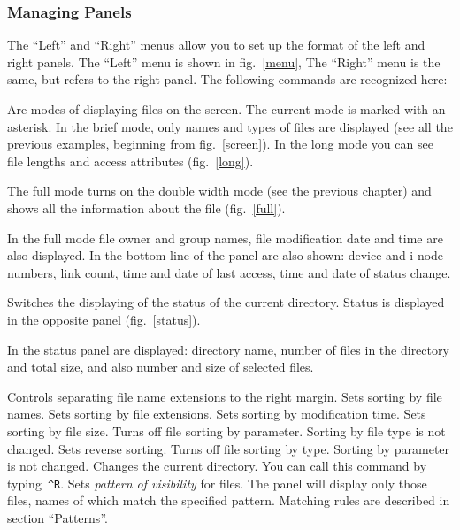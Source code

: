 \subsubsection{Managing Panels}
 
The ``Left'' and ``Right'' menus allow you to set up the format of the left and
right panels. The ``Left'' menu is shown in fig.~\ref{menu}, The ``Right''
menu is the same, but refers to the right panel. The following commands are
recognized here:
\begin{example}
Are modes of displaying files on the screen. The current mode is marked
with an asterisk. In the brief mode, only names and types of files are
displayed (see all the previous examples, beginning from fig.~\ref{screen}).
In the long mode you can see file lengths and access attributes
(fig.~\ref{long}).
\end{example}


The full mode turns on the double width mode (see the previous chapter)
and shows all the information about the file (fig.~\ref{full}).


In the full mode file owner and group names, file modification date and time
are also displayed. In the bottom line of the panel are also shown: device
and i-node numbers, link count, time and date of last access, time and date
of status change.

\begin{example}
Switches the displaying of the status of the current directory.
Status is displayed in the opposite panel (fig.~\ref{status}).
\end{example}


In the status panel are displayed: directory name, number of files in the
directory and total size, and also number and size of selected files.

\begin{example}
Controls separating file name extensions to the right margin.
Sets sorting by file names.
Sets sorting by file extensions.
Sets sorting by modification time.
Sets sorting by file size.
Turns off file sorting by parameter. Sorting by file type is not changed.
Sets reverse sorting.
Turns off file sorting by type. Sorting by parameter is not changed.
Changes the current directory. You can call this command by typing~{\tt \^{}R}.
Sets {\em pattern of visibility} for files. The panel will display
only those files, names of which match the specified pattern.
Matching rules are described in section ``Patterns''.
\end{example}

